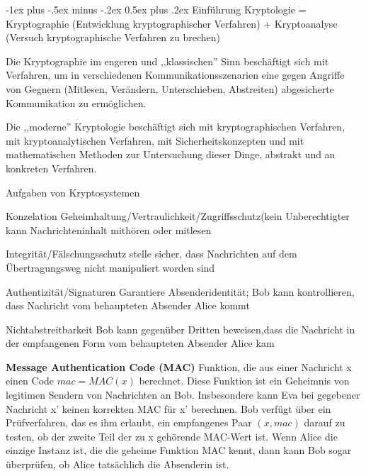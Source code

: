 \documentclass[a4paper]{article}
\makeatletter
\renewcommand{\note}[2]{\begin{noteBox} \textbf{#1} #2 \end{noteBox}}
\renewcommand{\section}{\@startsection{section}{1}{0mm}%
 {-1ex plus -.5ex minus -.2ex}%
 {0.5ex plus .2ex}%
 {\normalfont\large\bfseries}}
\makeatother
\begin{document}
\raggedright
\begin{multicols}{3}\scriptsize
    \setlength{\premulticols}{1pt}
    \setlength{\postmulticols}{1pt}
    \setlength{\multicolsep}{1pt}
    \setlength{\columnsep}{2pt}

    \section{Einführung}
    Kryptologie = Kryptographie (Entwicklung kryptographischer Verfahren) + Kryptoanalyse (Versuch kryptographische Verfahren zu brechen)

    Die Kryptographie im engeren und ,,klassischen'' Sinn beschäftigt sich mit Verfahren, um in verschiedenen Kommunikationsszenarien eine gegen Angriffe von Gegnern (Mitlesen, Verändern, Unterschieben, Abstreiten) abgesicherte Kommunikation zu ermöglichen.

    Die ,,moderne'' Kryptologie beschäftigt sich mit kryptographischen Verfahren, mit kryptoanalytischen Verfahren, mit Sicherheitskonzepten und mit mathematischen Methoden zur Untersuchung dieser Dinge, abstrakt und an konkreten Verfahren.

    Aufgaben von Kryptosystemen
    \begin{description*}
        \item[Konzelation] Geheimhaltung/Vertraulichkeit/Zugriffsschutz(kein Unberechtigter kann Nachrichteninhalt mithören oder mitlesen
        \item[Integrität/Fälschungsschutz] stelle sicher, dass Nachrichten auf dem Übertragungsweg nicht manipuliert worden sind
        \item[Authentizität/Signaturen] Garantiere Absenderidentität; Bob kann kontrollieren, dass Nachricht vom behaupteten Absender Alice kommt
        \item[Nichtabstreitbarkeit] Bob kann gegenüber Dritten beweisen,dass die Nachricht in der empfangenen Form vom behaupteten Absender Alice kam
    \end{description*}

    \note{Message Authentication Code (MAC)}{
        Funktion, die aus einer Nachricht x einen Code $mac=MAC(x)$ berechnet. Diese Funktion ist ein Geheimnis von legitimen Sendern von Nachrichten an Bob. Insbesondere kann Eva bei gegebener Nachricht x' keinen korrekten MAC für x' berechnen. Bob verfügt über ein Prüfverfahren, das es ihm erlaubt, ein empfangenes Paar $(x,mac)$ darauf zu testen, ob der zweite Teil der zu x gehörende MAC-Wert ist. Wenn Alice die einzige Instanz ist, die die geheime Funktion MAC kennt, dann kann Bob sogar überprüfen, ob Alice tatsächlich die Absenderin ist.
    }


\end{multicols}
\end{document}
